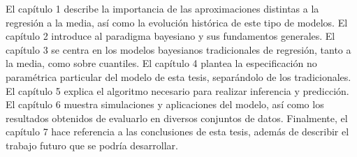 \documentclass[letterpaper,onside,11pt,review,usenames,dvipsnames]{report}
\begin{document}
El cap\'itulo 1 describe la importancia de las aproximaciones distintas a la regresi\'on a la media, así como la evoluci\'on hist\'orica de este tipo de modelos. El cap\'itulo 2 introduce al paradigma bayesiano y sus fundamentos generales. El cap\'itulo 3 se centra en los modelos bayesianos tradicionales de regresi\'on, tanto a la media, como sobre cuantiles. El cap\'itulo 4 plantea la especificaci\'on no param\'etrica particular del modelo de esta tesis, separ\'andolo de los tradicionales. El cap\'itulo 5 explica el algoritmo necesario para realizar inferencia y predicci\'on. El cap\'itulo 6 muestra simulaciones y aplicaciones del modelo, as\'i como los resultados obtenidos de evaluarlo en diversos conjuntos de datos. Finalmente, el cap\'itulo 7 hace referencia a las conclusiones de esta tesis, adem\'as de describir el trabajo futuro que se podr\'ia desarrollar.




\renewcommand{\baselinestretch}{0.75}\normalsize
\tableofcontents
\renewcommand{\baselinestretch}{1.0}\normalsize
















\nocite{*} %

\appendix




\end{document}
